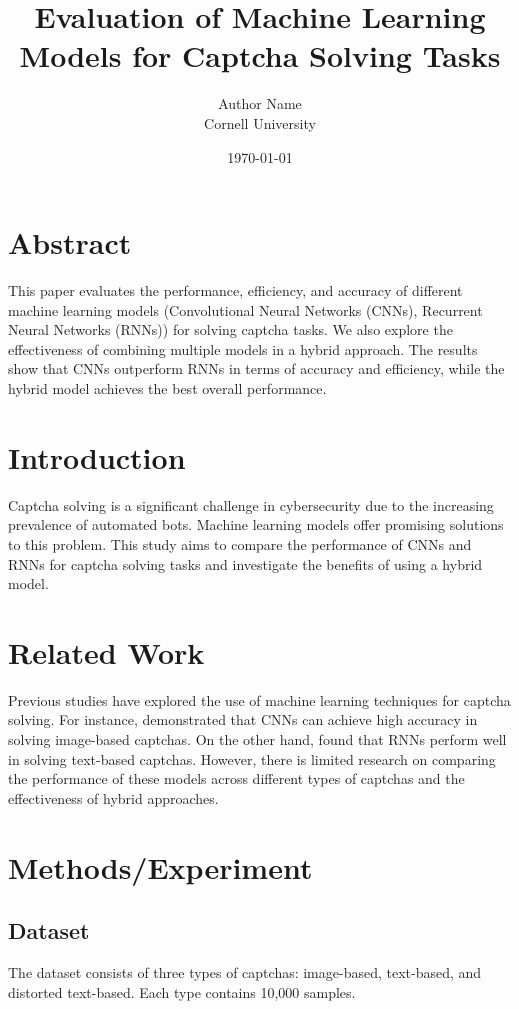 \documentclass{article}
\title{Evaluation of Machine Learning Models for Captcha Solving Tasks}
\author{Author Name \\ Cornell University}
\date{\today}
\begin{document}
\maketitle

\section{Abstract}
This paper evaluates the performance, efficiency, and accuracy of different machine learning models (Convolutional Neural Networks (CNNs), Recurrent Neural Networks (RNNs)) for solving captcha tasks. We also explore the effectiveness of combining multiple models in a hybrid approach. The results show that CNNs outperform RNNs in terms of accuracy and efficiency, while the hybrid model achieves the best overall performance.

\section{Introduction}
Captcha solving is a significant challenge in cybersecurity due to the increasing prevalence of automated bots. Machine learning models offer promising solutions to this problem. This study aims to compare the performance of CNNs and RNNs for captcha solving tasks and investigate the benefits of using a hybrid model.

\section{Related Work}
Previous studies have explored the use of machine learning techniques for captcha solving. For instance, \cite{cnn_study} demonstrated that CNNs can achieve high accuracy in solving image-based captchas. On the other hand, \cite{rnn_study} found that RNNs perform well in solving text-based captchas. However, there is limited research on comparing the performance of these models across different types of captchas and the effectiveness of hybrid approaches.

\section{Methods/Experiment}
\subsection{Dataset}
The dataset consists of three types of captchas: image-based, text-based, and distorted text-based. Each type contains 10,000 samples.
\end{document}
